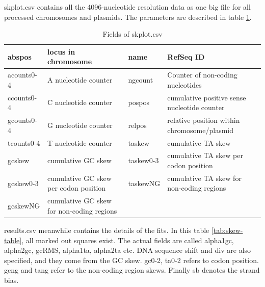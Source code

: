 \documentclass[fleqn,10pt]{wlscirep}
\begin{document}
skplot.csv contains all the 4096-nucleotide resolution data as one big file for all processed chromosomes and plasmids. The parameters are described in table \ref{tab:skplot}.
\begin{table}[ht]
\begin{tabular}{|l|l|l|l|}
\hline
abspos     & locus in chromosome                       & name      & RefSeq ID                                   \\ \hline
acounts0-4 & A nucleotide counter                      & ngcount   & Counter of non-coding nucleotides           \\ \hline
ccounts0-4 & C nucleotide counter                      & pospos    & cumulative positive sense nucleotide counter \\ \hline
gcounts0-4 & G nucleotide counter                      & relpos    & relative position within chromosome/plasmid \\ \hline
tcounts0-4 & T nucleotide counter                      & taskew    & cumulative TA skew                          \\ \hline
gcskew     & cumulative GC skew                        & taskew0-3 & cumulative TA skew per codon position       \\ \hline
gcskew0-3  & cumulative GC skew per codon position     & taskewNG  & cumulative TA skew for non-coding regions   \\ \hline
gcskewNG   & cumulative GC skew for non-coding regions &           &                                             \\ \hline
\end{tabular}
\caption{Fields of skplot.csv}
\label{tab:skplot}
\end{table}

results.csv meanwhile contains the details of the fits. In this table \ref{tab:skew-table}, all marked out squares exist. The actual fields
are called alpha1gc, alpha2gc, gcRMS, alpha1ta, alpha2ta etc. DNA sequence shift and div are also specified, and they come from the GC skew.
gc0-2, ta0-2 refers to codon position. gcng and tang refer to the non-coding region skews. Finally sb denotes the strand bias. 
\end{document}
